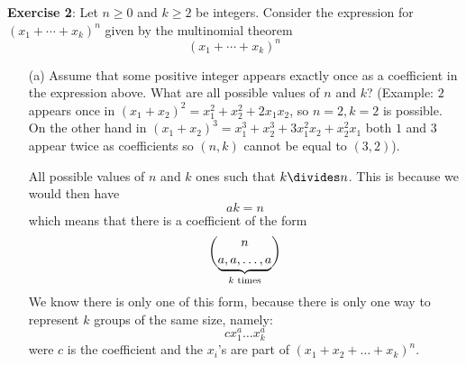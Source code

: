 \documentclass{article}
\begin{document}
\textbf{Exercise 2}: Let $n \geq 0$ and $k \geq 2$ be integers. Consider the expression for $(x_{1} + \cdots + x_{k})^{n}$ given by the multinomial theorem
    \begin{equation*}
        (x_{1} + \cdots + x_{k})^{n}
    \end{equation*}
    \begin{itemize}
        \item [(a)] Assume that some positive integer appears exactly once as a coefficient in the expression above. What are all possible values of $n$ and $k$? (Example: $2$ appears once in $(x_{1} + x_{2})^{2} = x_{1}^{2} + x_{2}^{2} + 2x_{1}x_{2}$, so $n = 2, k = 2$ is possible. On the other hand in $(x_{1} + x_{2})^{3} = x_{1}^{3} + x_{2}^{3} + 3x_{1}^{2}x_{2} + x_{2}^{2}x_{1}$ both $1$ and $3$ appear twice as coefficients so $(n, k)$ cannot be equal to $(3, 2)$).
            \begin{answer}
                All possible values of $n$ and $k$ ones such that $k \divides n$. This is because we would then have
                    \begin{equation*}
                        ak = n
                    \end{equation*}
                which means that there is a coefficient of the form
                    \begin{equation*}
                        \dbinom{n}{\underbrace{a, a, \ldots, a}_{k \text{ times}}}
                    \end{equation*}
                We know there is only one of this form, because there is only one way to represent $k$ groups of the same size, namely:
                    \begin{equation*}
                        cx_{1}^{a}\ldots x_{k}^{a}
                    \end{equation*}
                were $c$ is the coefficient and the $x_{i}$'s are part of $(x_{1} + x_{2} + \ldots + x_{k})^{n}$.
            \end{answer}


\end{itemize}
\end{document}
